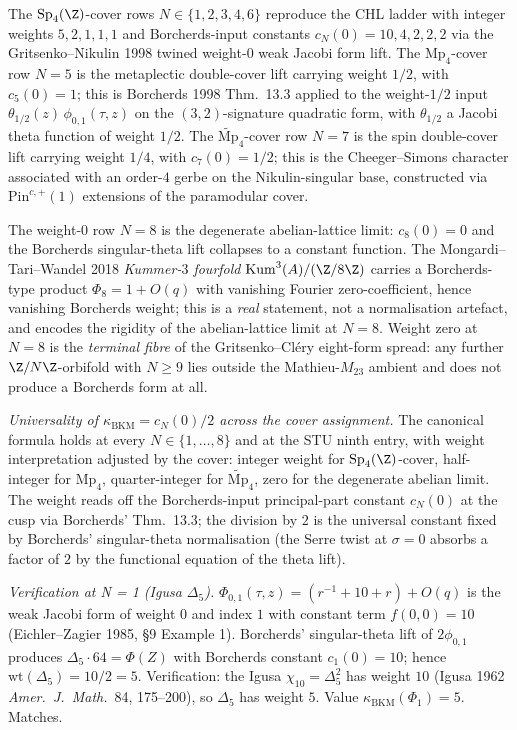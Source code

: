 The $\mathrm{Sp}_4(\Z)$-cover rows $N \in \{1, 2, 3, 4, 6\}$
reproduce the CHL ladder with integer weights $5, 2, 1, 1, 1$ and
Borcherds-input constants $c_N(0) = 10, 4, 2, 2, 2$ via the
Gritsenko--Nikulin 1998 twined weight-$0$ weak Jacobi form lift.
The $\mathrm{Mp}_4$-cover row $N = 5$ is the metaplectic
double-cover lift carrying weight $1/2$, with $c_5(0) = 1$; this
is Borcherds 1998 Thm.~13.3 applied to the weight-$1/2$ input
$\theta_{1/2}(z)\,\phi_{0, 1}(\tau, z)$ on the
$(3, 2)$-signature quadratic form, with $\theta_{1/2}$ a Jacobi
theta function of weight $1/2$. The
$\widetilde{\mathrm{Mp}}_4$-cover row $N = 7$ is the
spin double-cover lift carrying weight $1/4$, with $c_7(0) = 1/2$;
this is the Cheeger--Simons character associated with an
order-$4$ gerbe on the Nikulin-singular base, constructed via
$\mathrm{Pin}^{c, +}(1)$ extensions of the paramodular cover.

The weight-$0$ row $N = 8$ is the degenerate abelian-lattice
limit: $c_8(0) = 0$ and the Borcherds singular-theta lift
collapses to a constant function. The
Mongardi--Tari--Wandel 2018 \emph{Kummer-$3$ fourfold}
$\mathrm{Kum}^3(A)/(\Z/8\Z)$ carries a Borcherds-type product
$\Phi_8 = 1 + O(q)$ with vanishing Fourier zero-coefficient,
hence vanishing Borcherds weight; this is a \emph{real}
statement, not a normalisation artefact, and encodes the
rigidity of the abelian-lattice limit at $N = 8$. Weight zero at
$N = 8$ is the \emph{terminal fibre} of the Gritsenko--Cl\'ery
eight-form spread: any further $\Z/N\Z$-orbifold with
$N \geq 9$ lies outside the Mathieu-$M_{23}$ ambient and does not
produce a Borcherds form at all.

\emph{Universality of $\kappa_{\mathrm{BKM}} = c_N(0)/2$ across the
cover assignment.} The canonical formula holds at every $N \in
\{1, \ldots, 8\}$ and at the STU ninth entry, with weight
interpretation adjusted by the cover: integer weight for
$\mathrm{Sp}_4(\Z)$-cover, half-integer for $\mathrm{Mp}_4$,
quarter-integer for $\widetilde{\mathrm{Mp}}_4$, zero for the
degenerate abelian limit. The weight reads off the
Borcherds-input principal-part constant $c_N(0)$ at the cusp
via Borcherds' Thm.~13.3; the division by $2$ is the universal
constant fixed by Borcherds' singular-theta
normalisation (the Serre twist at $\sigma = 0$ absorbs a factor
of $2$ by the functional equation of the theta lift).

\emph{Verification at N = 1 (Igusa $\Delta_5$).} $\Phi_{0, 1}(\tau,
z) = (r^{-1} + 10 + r) + O(q)$ is the weak Jacobi form of weight $0$
and index $1$ with constant term $f(0, 0) = 10$
(Eichler--Zagier 1985, \S9 Example 1). Borcherds' singular-theta
lift of $2\phi_{0, 1}$ produces
$\Delta_5 \cdot 64 = \Phi(Z)$ with Borcherds constant $c_1(0) = 10$;
hence $\mathrm{wt}(\Delta_5) = 10/2 = 5$. Verification: the
Igusa $\chi_{10} = \Delta_5^2$ has weight $10$ (Igusa 1962
\emph{Amer.\ J.\ Math.}~84, 175--200), so $\Delta_5$ has weight
$5$. Value $\kappa_{\mathrm{BKM}}(\Phi_1) = 5$. Matches.

